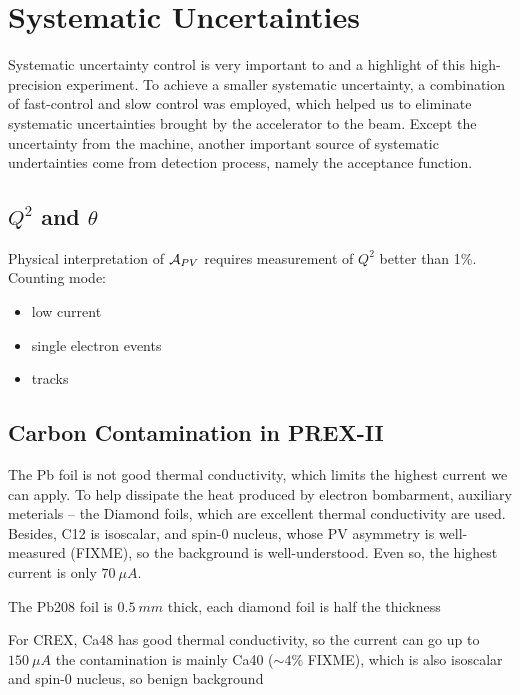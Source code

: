 \chapter{Systematic Uncertainties}

Systematic uncertainty control is very important to and a highlight of this 
high-precision experiment. To achieve a smaller systematic uncertainty, a
combination of fast-control and slow control was employed, which helped us
to eliminate systematic uncertainties brought by the accelerator to the
beam. Except the uncertainty from the machine, another important source
of systematic undertainties come from detection process, namely the 
acceptance function.

\section{$Q^2$ and $\theta$}
Physical interpretation of $\mathcal{A}_{PV}$ requires measurement of $Q^2$ better
than 1\%.
Counting mode:
\begin{itemize}
    \item low current
    \item single electron events
    \item tracks 
\end{itemize}

\section{Carbon Contamination in PREX-II}
The Pb foil is not good thermal conductivity, which limits the highest current
we can apply. To help dissipate the heat produced
by electron bombarment, auxiliary meterials -- the Diamond foils, which are 
excellent thermal conductivity are used. Besides, C12 is isoscalar, and spin-0 
nucleus, whose PV asymmetry is well-measured (FIXME), so the background is 
well-understood. Even so, the highest current is only $70 \ \mu A$.

The Pb208 foil is $0.5\ mm$ thick, each diamond foil is half the thickness 

For CREX, Ca48 has good thermal conductivity, so the current can go up to $150\ \mu A$
the contamination is mainly Ca40 ($\sim 4\%$ FIXME), which is also isoscalar
and spin-0 nucleus, so benign background

